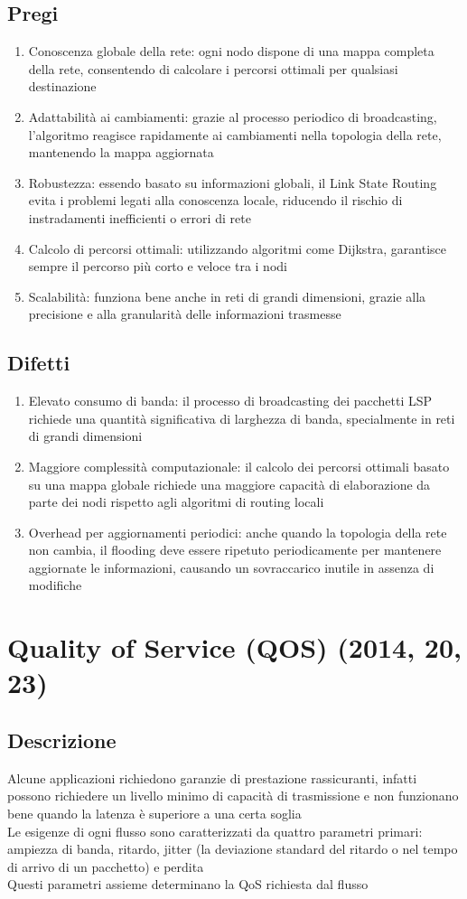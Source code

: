 \documentclass[10pt,oneside,a4paper]{article}
\begin{document}
\subsection{Pregi}
\begin{enumerate}
\item Conoscenza globale della rete: ogni nodo dispone di una mappa completa della rete, consentendo di calcolare i percorsi ottimali per qualsiasi destinazione
\item Adattabilità ai cambiamenti: grazie al processo periodico di broadcasting, l’algoritmo reagisce rapidamente ai cambiamenti nella topologia della rete, mantenendo la mappa aggiornata
\item Robustezza: essendo basato su informazioni globali, il Link State Routing evita i problemi legati alla conoscenza locale, riducendo il rischio di instradamenti inefficienti o errori di rete
\item Calcolo di percorsi ottimali: utilizzando algoritmi come Dijkstra, garantisce sempre il percorso più corto e veloce tra i nodi
\item Scalabilità: funziona bene anche in reti di grandi dimensioni, grazie alla precisione e alla granularità delle informazioni trasmesse
\end{enumerate}
\subsection{Difetti}
\begin{enumerate}
\item Elevato consumo di banda: il processo di broadcasting dei pacchetti LSP richiede una quantità significativa di larghezza di banda, specialmente in reti di grandi dimensioni
\item Maggiore complessità computazionale: il calcolo dei percorsi ottimali basato su una mappa globale richiede una maggiore capacità di elaborazione da parte dei nodi rispetto agli algoritmi di routing locali
\item Overhead per aggiornamenti periodici: anche quando la topologia della rete non cambia, il flooding deve essere ripetuto periodicamente per mantenere aggiornate le informazioni, causando un sovraccarico inutile in assenza di modifiche
\end{enumerate}
\section{Quality of Service (QOS) (2014, 20, 23)}
\subsection{Descrizione}
Alcune applicazioni richiedono garanzie di prestazione rassicuranti, infatti possono richiedere un livello minimo di capacità di trasmissione e non funzionano bene quando la latenza è superiore a una certa soglia\\
Le esigenze di ogni flusso sono caratterizzati da quattro parametri primari: ampiezza di banda, ritardo, jitter (la deviazione standard del ritardo o nel tempo di arrivo di un pacchetto) e perdita\\
Questi parametri assieme determinano la QoS richiesta dal flusso
\end{document}
